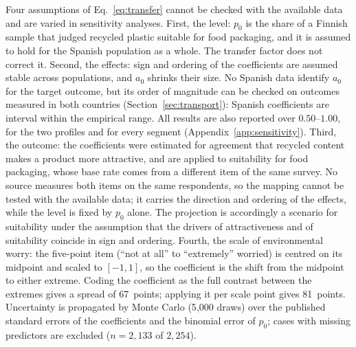 Four assumptions of Eq.~\eqref{eq:transfer} cannot be checked with the
available data and are varied in sensitivity analyses. First, the level: $p_0$
is the share of a Finnish sample that judged recycled plastic suitable for food
packaging, and it is assumed to hold for the Spanish population as a whole.
The transfer factor does not correct it. Second, the effects: sign and ordering
of the coefficients are assumed stable across populations, and $a_0$ shrinks
their size. No Spanish data identify $a_0$ for the target outcome, but its
order of magnitude can be checked on outcomes measured in both countries
(Section~\ref{sec:transport}): Spanish coefficients are %
interval %
within the empirical range. All results are also reported over $0.50$--$1.00$,
for the two profiles and for every segment (Appendix~\ref{app:sensitivity}). Third, the outcome: the coefficients
were estimated for agreement that recycled content makes a product more
attractive, and are applied to suitability for food packaging, whose base rate
comes from a different item of the same survey. No source measures both items
on the same respondents, so the mapping cannot be tested with the available
data; it carries the direction and ordering of the effects, while the level is
fixed by $p_0$ alone. The projection is accordingly a scenario for suitability
under the assumption that the drivers of attractiveness and of suitability
coincide in sign and ordering. Fourth, the scale of environmental worry: the
five-point item (``not at all'' to ``extremely'' worried) is centred on its
midpoint and scaled to $[-1, 1]$, so the coefficient is the shift from the
midpoint to either extreme. Coding the coefficient as the full contrast between
the extremes gives a spread of 67~points; applying it per scale point gives
81~points. Uncertainty is propagated by Monte Carlo
(5{,}000 draws) over the published standard errors of the coefficients and the
binomial error of $p_0$; cases with missing predictors are excluded
($n = 2{,}133$ of $2{,}254$).

